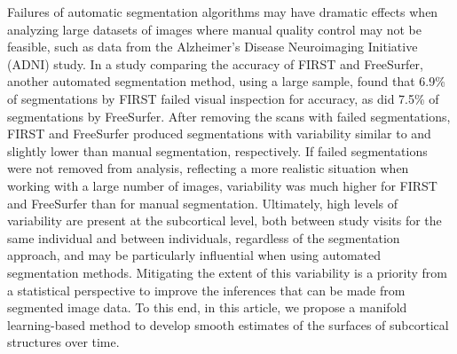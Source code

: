\documentclass[12pt]{article}
\theoremstyle{definition}
\begin{document}
Failures of automatic segmentation algorithms may have dramatic effects when analyzing large datasets of images where manual quality control may not be feasible, such as data from the Alzheimer's Disease Neuroimaging Initiative (ADNI) study. In a study comparing the accuracy of FIRST and FreeSurfer, another automated segmentation method, using a large sample, \cite{mulderHippocampalVolumeChange2014} found that 6.9\% of segmentations by FIRST failed visual inspection for accuracy, as did 7.5\% of segmentations by FreeSurfer. After removing the scans with failed segmentations, FIRST and FreeSurfer produced segmentations with variability similar to and slightly lower than manual segmentation, respectively. If failed segmentations were not removed from analysis, reflecting a more realistic situation when working with a large number of images, variability was much higher for FIRST and FreeSurfer than for manual segmentation. Ultimately, high levels of variability are present at the subcortical level, both between study visits for the same individual and between individuals, regardless of the segmentation approach, and may be particularly influential when using automated segmentation methods. Mitigating the extent of this variability is a priority from a statistical perspective to improve the inferences that can be made from segmented image data. To this end, in this article, we propose a manifold learning-based method to develop smooth estimates of the surfaces of subcortical structures over time.



\end{document}

